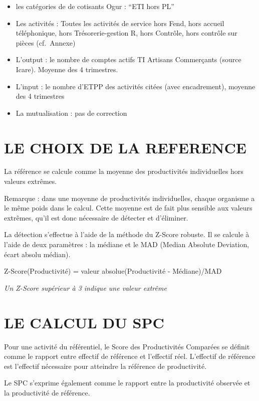 \documentclass[
]{book}
\begin{document}
\begin{itemize}
\item
  les catégories de de cotisants Ogur : ``ETI hors PL''
\item
  Les activités :
  Toutes les activités de service hors Fend, hors accueil téléphonique, hors Trésorerie-gestion R, hors Contrôle, hors contrôle sur pièces (cf.~Annexe)
\item
  L'output : le nombre de comptes actifs TI Artisans Commerçants (source Icare). Moyenne des 4 trimestres.
\item
  L'input : le nombre d'ETPP des activités citées (avec encadrement), moyenne des 4 trimestres
\item
  La mutualisation : pas de correction
\end{itemize}

\hypertarget{le-choix-de-la-reference-3}{%
\section{LE CHOIX DE LA REFERENCE}\label{le-choix-de-la-reference-3}}

La référence se calcule comme la moyenne des productivités individuelles hors valeurs extrêmes.

Remarque : dans une moyenne de productivités individuelles, chaque organisme a le même poids dans le calcul. Cette moyenne est de fait plus sensible aux valeurs extrêmes, qu'il est donc nécessaire de détecter et d'éliminer.

La détection s'effectue à l'aide de la méthode du Z-Score robuste.
Il se calcule à l'aide de deux paramètres : la médiane et le MAD (Median Absolute Deviation, écart absolu médian).

Z-Score(Productivité) = valeur absolue(Productivité - Médiane)/MAD

\emph{Un Z-Score supérieur à 3 indique une valeur extrême}

\hypertarget{le-calcul-du-spc-4}{%
\section{LE CALCUL DU SPC}\label{le-calcul-du-spc-4}}

Pour une activité du référentiel, le Score des Productivités Comparées se définit comme le rapport entre effectif de référence et l'effectif réel. L'effectif de référence est l'effectif nécessaire pour atteindre la référence de productivité.

Le SPC s'exprime également comme le rapport entre la productivité observée et la productivité de référence.
\end{document}
